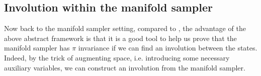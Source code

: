 \documentclass{article}
\begin{document}









\subsection{Involution within the manifold sampler}
Now back to the manifold sampler setting, compared to \cite{manifoldparent}, the advantage of the above abstract framework is that it is a good tool to help us prove that the manifold sampler has $\pi$ invariance if we can find an involution between the states. Indeed, by the trick of augmenting space, i.e. introducing some necessary auxiliary variables, we can construct an involution from the manifold sampler.
\end{document}
